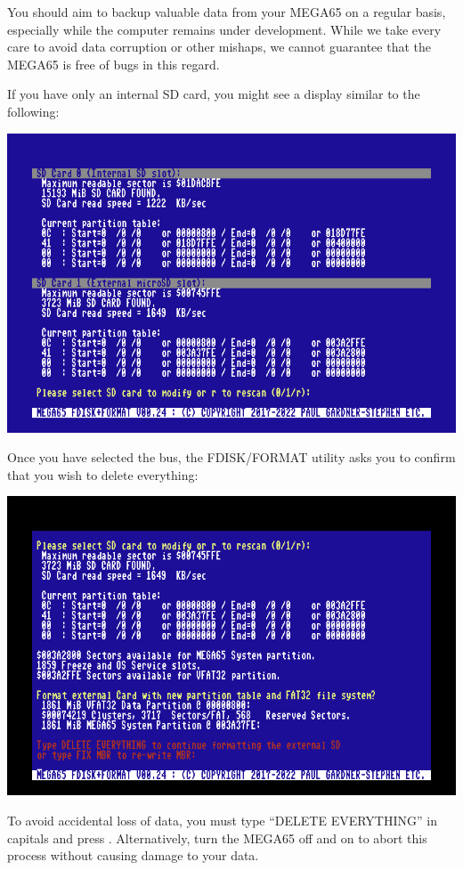 You should aim to backup valuable data from your
MEGA65 on a regular basis, especially while the computer remains under
development.  While we take every care to avoid data corruption or
other mishaps, we cannot guarantee that the MEGA65 is free of bugs in
this regard.

If you have only an internal SD card, you might see a
display similar to the following:

\includegraphics[width=\linewidth]{images/ss-m65fdisk-busselect.png}

Once you have selected the bus, the FDISK/FORMAT utility asks you to confirm that you wish to delete everything:

\includegraphics[width=\linewidth]{images/ss-m65fdisk-typesomething.png}

To avoid accidental loss of data, you must type ``DELETE EVERYTHING'' in capitals and press . Alternatively, turn the MEGA65 off and on to abort this process without causing damage to your data.

